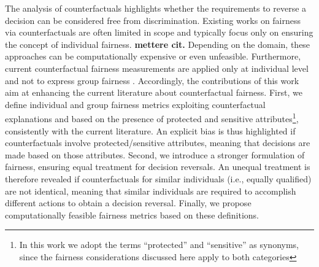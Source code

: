 \documentclass[letterpaper]{article} %
\begin{document}
The analysis of counterfactuals highlights whether the requirements to reverse a decision can be considered free from discrimination. Existing works on fairness via counterfactuals are often limited in scope and typically focus only on ensuring the concept of individual fairness. \textbf{mettere cit.}
%
Depending on the domain, these approaches can be computationally expensive or even unfeasible.
%
Furthermore, current counterfactual fairness measurements are applied only at individual level and not to express group fairness \cite{wachter2017counterfactual}.
%
Accordingly, the contributions of this work aim at enhancing the current literature about counterfactual fairness.
%
First, we define individual and group fairness metrics exploiting counterfactual explanations and based on the presence of protected and sensitive attributes\footnote{In this work we adopt the terms ``protected'' and ``sensitive'' as synonyms, since the fairness considerations discussed here apply to both categories}, consistently with the current literature.
%
An explicit bias is thus highlighted if counterfactuals involve protected/sensitive attributes, meaning that decisions are made based on those attributes.
%
Second, we introduce a stronger formulation of fairness, ensuring equal treatment for decision reversals.
%
An unequal treatment is therefore revealed if counterfactuals for similar individuals (i.e., equally qualified) are not identical, meaning that similar individuals are required to accomplish different actions to obtain a decision reversal.
%
Finally, we propose computationally feasible fairness metrics based on these definitions.



\end{document}
